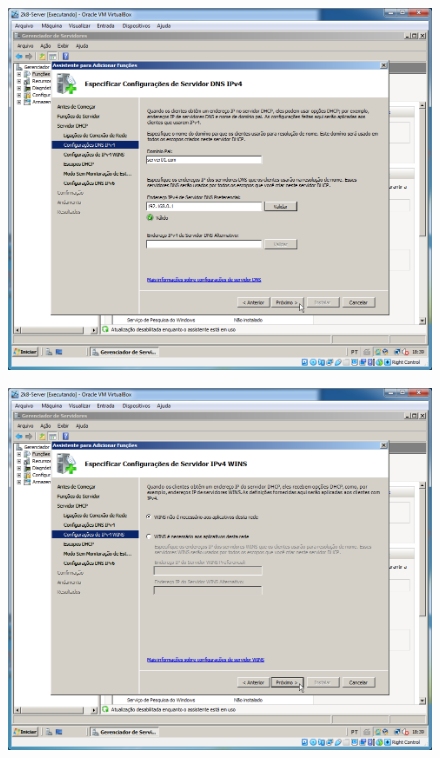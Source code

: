 \documentclass[10pt]{article}
\begin{document}
\begin{figure}[H]
    \centering
    \caption{}
    \label{fig:5313}
    \includegraphics[width=\linewidth]{images/windows_server/dhcp/009.png}
\end{figure}
\begin{figure}[H]
    \centering
    \caption{}
    \label{fig:5314}
    \includegraphics[width=\linewidth]{images/windows_server/dhcp/010.png}
\end{figure}
\end{document}
